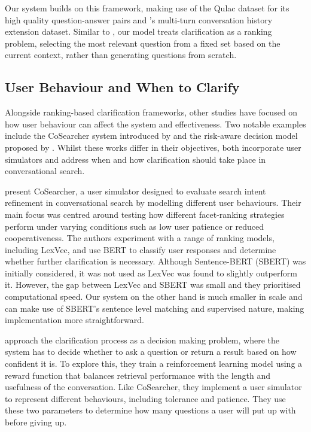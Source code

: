 \documentclass[11pt]{article}
\begin{document}
Our system builds on this framework, making use of the Qulac dataset for its high quality question-answer pairs and \citeauthor{Aliannejadi2019}'s multi-turn conversation history extension dataset. Similar to \citeauthor{Aliannejadi2019}, our model treats clarification as a ranking problem, selecting the most relevant question from a fixed set based on the current context, rather than generating questions from scratch.

\subsection{User Behaviour and When to Clarify}
Alongside ranking-based clarification frameworks, other studies have focused on how user behaviour can affect the system and effectiveness. Two notable examples include the CoSearcher system introduced by \citet{Salle2022} and the risk-aware decision model proposed by \citet{Wang2022}. Whilst these works differ in their objectives, both incorporate user simulators and address when and how clarification should take place in conversational search.

\citet{Salle2022} present CoSearcher, a user simulator designed to evaluate search intent refinement in conversational search by modelling different user behaviours. Their main focus was centred around testing how different facet-ranking strategies perform under varying conditions such as low user patience or reduced cooperativeness. The authors experiment with a range of ranking models, including LexVec, and use BERT to classify user responses and determine whether further clarification is necessary. Although Sentence-BERT (SBERT) was initially considered, it was not used as LexVec was found to slightly outperform it. However, the gap between LexVec and SBERT was small and they prioritised computational speed. Our system on the other hand is much smaller in scale and can make use of SBERT's sentence level matching and supervised nature, making implementation more straightforward.

\citet{Wang2022} approach the clarification process as a decision making problem, where the system has to decide whether to ask a question or return a result based on how confident it is. To explore this, they train a reinforcement learning model using a reward function that balances retrieval performance with the length and usefulness of the conversation. Like CoSearcher, they implement a user simulator to represent different behaviours, including tolerance and patience. They use these two parameters to determine how many questions a user will put up with before giving up.
\end{document}
